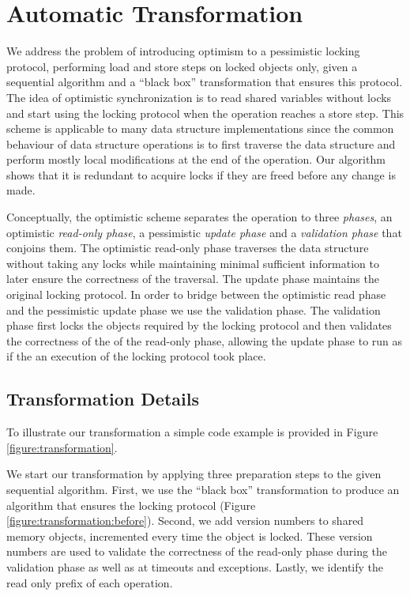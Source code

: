 \section{Automatic Transformation}\label{sec:algorithm}
We address the problem of introducing 
optimism to a pessimistic locking protocol, 
performing load and store steps on locked objects only, 
given a sequential algorithm and a ``black box'' 
transformation that ensures this protocol.
The idea of optimistic synchronization is to read 
shared variables without locks and start using the 
locking protocol when the operation reaches a store step.
This scheme is applicable to many data structure implementations
since the common behaviour of data structure operations 
is to first traverse the data structure and 
perform mostly local modifications at the end of the operation.
Our algorithm shows that it is redundant to 
acquire locks if they are freed before any change is made.    

Conceptually, the optimistic scheme separates the operation to three
\emph{phases}, an optimistic \emph{read-only phase},
a pessimistic \emph{update phase} and a 
\emph{validation phase} that conjoins them. 
The optimistic read-only phase traverses the data 
structure without taking any locks while maintaining 
minimal sufficient information to later ensure the 
correctness of the traversal.
The update phase maintains the original locking protocol. 
In order to bridge between the optimistic read phase and the  
pessimistic update phase we use the validation phase. 
The validation phase first locks the objects required by
the locking protocol and then validates the correctness
of the of the read-only phase, allowing the 
update phase to run as if the an execution of the locking
protocol took place.  

  


\subsection{Transformation Details}
To illustrate our transformation a simple code example is 
provided in Figure \ref{figure:transformation}.

We start our transformation by applying three preparation steps
to the given sequential algorithm.
First, we use the ``black box'' transformation to produce an
algorithm that ensures the locking protocol 
(Figure \ref{figure:transformation:before}). 
Second, we add version numbers to shared memory objects, 
incremented every time the object is locked. 
These version numbers are used 
to validate the correctness of the read-only phase during 
the validation phase as well as at timeouts and exceptions.
Lastly, we identify the read only prefix of each operation. 

